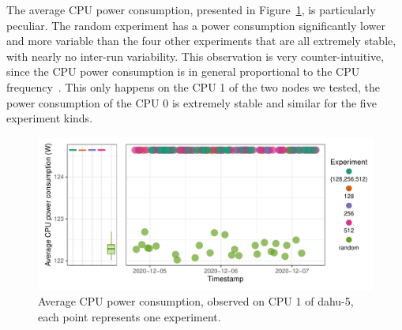             The average CPU power consumption, presented in
            Figure~\ref{fig:randomizing_sizes:expfile:fixing_K:power_CPU}, is particularly peculiar. The random
            experiment has a power consumption significantly lower and more variable than the four other experiments
            that are all extremely stable, with nearly no inter-run variability. This observation is very
            counter-intuitive, since the CPU power consumption is in general proportional to the CPU
            frequency~\cite{heinrich:hal-01523608}.  This only happens on the CPU 1 of the two nodes we tested, the
            power consumption of the CPU 0 is extremely stable and similar for the five experiment kinds.

            \begin{figure}[htpb]
                \centering
                \includegraphics[width=1\linewidth]{img/experiment/randomizing_sizes/fixing_K/average_power_CPU.pdf}
                \caption{Average CPU power consumption, observed on CPU 1 of dahu-5, each point represents one experiment.}%
                \label{fig:randomizing_sizes:expfile:fixing_K:power_CPU}
            \end{figure}

